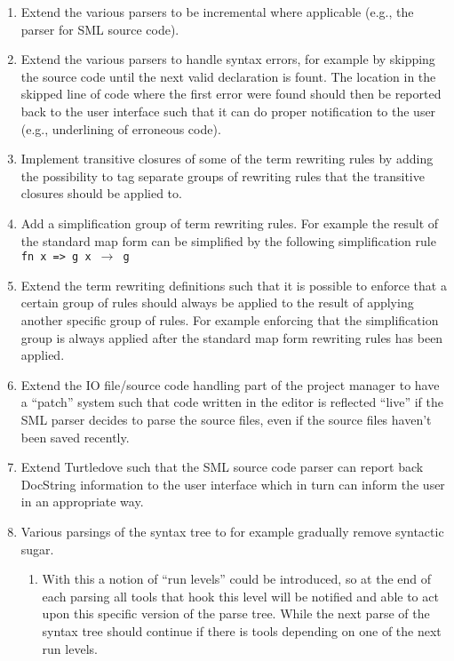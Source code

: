 \documentclass[a4paper,oneside]{article}
\begin{document}
\begin{enumerate}


\item Extend the various parsers to be incremental where applicable (e.g., the
  parser for SML source code).

\item Extend the various parsers to handle syntax errors, for example by
  skipping the source code until the next valid declaration is fount.
  The location in the skipped line of code where the first error were found
  should then be reported back to the user interface such that it can do proper
  notification to the user (e.g., underlining of erroneous code).



\item Implement transitive closures of some of the term rewriting rules by
  adding the possibility to tag separate groups of rewriting rules that the
  transitive closures should be applied to.


\item Add a simplification group of term rewriting rules. For example the result
  of the standard map form can be simplified by the following simplification
  rule \texttt{ fn x => g x $\rightarrow$ g}


\item Extend the term rewriting definitions such that it is possible to enforce
  that a certain group of rules should always be applied to the result of applying
  another specific group of rules. For example enforcing that the simplification
  group is always applied after the standard map form rewriting rules has been applied.


\item Extend the IO file/source code handling part of the project manager to
  have a ``patch'' system such that code written in the editor is reflected
  ``live'' if the SML parser decides to parse the source files, even if the
  source files haven't been saved recently.


\item Extend Turtledove such that the SML source code parser can report back
  DocString information to the user interface which in turn can inform the user
  in an appropriate way.



\item Various parsings of the syntax tree to for example gradually remove
  syntactic sugar.
  \begin{enumerate}

  \item With this a notion of ``run levels'' could be introduced, so at the end
    of each parsing all tools that hook this level will be notified and able to
    act upon this specific version of the parse tree. While the next parse of
    the syntax tree should continue if there is tools depending on one of the
    next run levels.

  \end{enumerate}

\end{enumerate}
\end{document}
